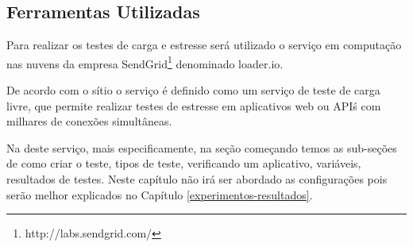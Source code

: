 







\subsection{Ferramentas Utilizadas}
\label{ferramentas-utilizadas-para-testes}
  
  Para realizar os testes de carga e estresse será utilizado o serviço em computação nas nuvens
  da empresa SendGrid\footnote{http://labs.sendgrid.com/} denominado loader.io.
  
  De acordo com o sítio o serviço é definido como um serviço de teste de carga livre,
  que permite realizar testes de estresse em aplicativos web ou API\'s com milhares de conexões simultâneas.
  
  Na \cite{SupportLoader:2014} deste serviço, mais especificamente, na seção começando
  temos as sub-seções de como criar o teste, tipos de teste, verificando um aplicativo, variáveis,
  resultados de testes. Neste capítulo não irá ser abordado as configurações pois serão melhor explicados
  no Capítulo \ref{experimentos-resultados}.